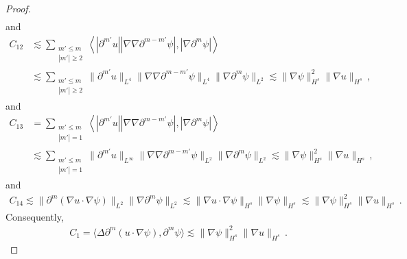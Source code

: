 \documentclass[reqno,11pt]{amsart}
\numberwithin{equation}{section}
\def\p{\partial}
\begin{document}
\begin{proof}
\begin{equation*}
\begin{aligned}
\end{aligned}
\end{equation*}
and
\begin{equation*}
\begin{aligned}
C_{12}&\lesssim\sum_{\substack{m' \leq m \\ |m'| \geq 2}} \left\langle |\partial^{m'} u| |\nabla \nabla \partial^{m - m'} \psi|, |\nabla \partial^m \psi| \right\rangle\\&
\lesssim \sum_{\substack{m' \leq m \\ |m'| \geq 2}} \|\partial^{m'} u\|_{L^4} \|\nabla \nabla \partial^{m - m'} \psi\|_{L^4} \|\nabla \partial^m \psi\|_{L^2} \lesssim \|\nabla \psi\|_{H^s}^2 \|\nabla u\|_{H^s} \,,
\end{aligned}
\end{equation*}
and
\begin{equation*}
\begin{aligned}
C_{13}&=\sum_{\substack{m' \leq m \\ |m'| = 1}} \left\langle |\partial^{m'} u| |\nabla \nabla \partial^{m - m'} \psi|, |\nabla \partial^m \psi| \right\rangle\\&
\lesssim \sum_{\substack{m' \leq m \\ |m'| = 1}}\|\partial^{m'} u\|_{L^\infty}\|\nabla \nabla \partial^{m - m'} \psi\|_{L^2}\|\nabla \partial^m \psi\|_{L^2} \lesssim\|\nabla \psi\|^2_{H^s}\|\nabla u\|_{H^s} \,,
\end{aligned}
\end{equation*}
and
\begin{equation*}
\begin{aligned}
C_{14} \lesssim \| \p^m ( \nabla u \cdot \nabla \psi ) \|_{L^2} \| \nabla \p^m \psi \|_{L^2} \lesssim \| \nabla u \cdot \nabla \psi \|_{H^s} \| \nabla \psi \|_{H^s} \lesssim \| \nabla \psi \|^2_{H^s} \| \nabla u \|_{H^s} \,.
\end{aligned}
\end{equation*}
Consequently,
\begin{equation}\label{gpsi-eq5}
\begin{aligned}
C_1=\langle \Delta\p^m(u\cdot\nabla\psi),\p^m\psi   \rangle\lesssim\|\nabla\psi\|^2_{H^s}\|\nabla u\|_{H^s} \,.
\end{aligned}
\end{equation}


\end{proof}
\end{document}
